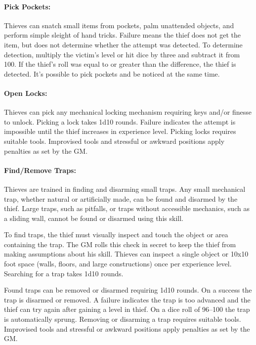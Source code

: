 \begin{multicols}{2}

\paragraph{Pick Pockets:} Thieves can snatch small items from pockets, palm unattended objects, and perform simple sleight of hand tricks.  Failure means the thief does not get the item, but does not determine whether the attempt was detected.  To determine detection, multiply the victim's level or hit dice by three and subtract it from 100.  If the thief's roll was equal to or greater than the difference, the thief is detected.  It's possible to pick pockets and be noticed at the same time.

\paragraph{Open Locks:} Thieves can pick any mechanical locking mechanism requiring keys and/or finesse to unlock.  Picking a lock takes 1d10 rounds.  Failure indicates the attempt is impossible until the thief increases in experience level.  Picking locks requires suitable tools.  Improvised tools and stressful or awkward positions apply penalties as set by the GM.

\paragraph{Find/Remove Traps:} Thieves are trained in finding and disarming small traps.  Any small mechanical trap, whether natural or artificially made, can be found and disarmed by the thief.  Large traps, such as pitfalls, or traps without accessible mechanics, such as a sliding wall, cannot be found or disarmed using this skill.

To find traps, the thief must visually inspect and touch the object or area containing the trap.  The GM rolls this check in secret to keep the thief from making assumptions about his skill.  Thieves can inspect a single object or 10x10 foot space (walls, floors, and large constructions) once per experience level.  Searching for a trap takes 1d10 rounds.

Found traps can be removed or disarmed requiring 1d10 rounds.  On a success the trap is disarmed or removed.  A failure indicates the trap is too advanced and the thief can try again after gaining a level in thief.  On a dice roll of 96--100 the trap is automatically sprung. Removing or disarming a trap requires suitable tools.  Improvised tools and stressful or awkward positions apply penalties as set by the GM.


\end{multicols}
